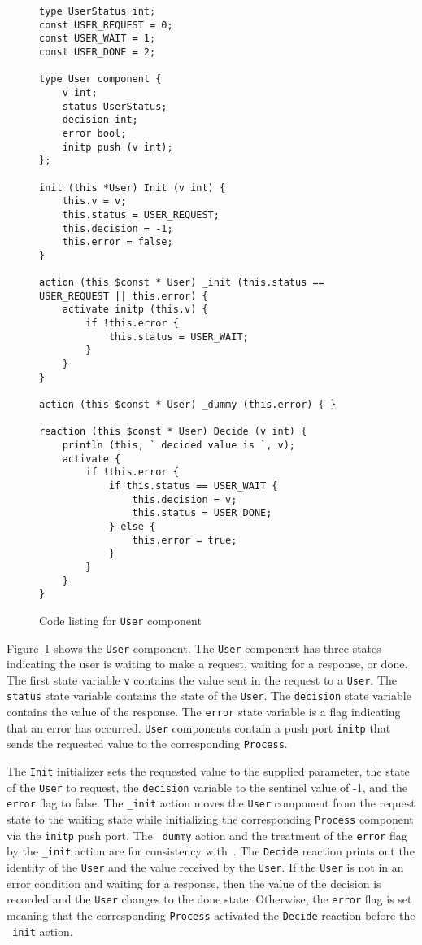 \begin{figure}
\begin{verbatim}
type UserStatus int;
const USER_REQUEST = 0;
const USER_WAIT = 1;
const USER_DONE = 2;

type User component {
    v int;
    status UserStatus;
    decision int;
    error bool;
    initp push (v int);
};

init (this *User) Init (v int) {
    this.v = v;
    this.status = USER_REQUEST;
    this.decision = -1;
    this.error = false;
}

action (this $const * User) _init (this.status == USER_REQUEST || this.error) {
    activate initp (this.v) {
        if !this.error {
            this.status = USER_WAIT;
        }
    }
}

action (this $const * User) _dummy (this.error) { }

reaction (this $const * User) Decide (v int) {
    println (this, ` decided value is `, v);
    activate {
        if !this.error {
            if this.status == USER_WAIT {
                this.decision = v;
                this.status = USER_DONE;
            } else {
                this.error = true;
            }
        }
    }
}
\end{verbatim}
\cprotect\caption{Code listing for \verb+User+ component \label{user}}
\end{figure}

Figure~\ref{user} shows the \verb+User+ component.
The \verb+User+ component has three states indicating the user is waiting to make a request, waiting for a response, or done.
The first state variable \verb+v+ contains the value sent in the request to a \verb+User+.
The \verb+status+ state variable contains the state of the \verb+User+.
The \verb+decision+ state variable contains the value of the response.
The \verb+error+ state variable is a flag indicating that an error has occurred.
\verb+User+ components contain a push port \verb+initp+ that sends the requested value to the corresponding \verb+Process+.

The \verb+Init+ initializer sets the requested value to the supplied parameter, the state of the \verb+User+ to request, the \verb+decision+ variable to the sentinel value of -1, and the \verb+error+ flag to false.
The \verb+_init+ action moves the \verb+User+ component from the request state to the waiting state while initializing the corresponding \verb+Process+ component via the \verb+initp+ push port.
The \verb+_dummy+ action and the treatment of the \verb+error+ flag by the \verb+_init+ action are for consistency with~\cite{nancy1996distributed}.
The \verb+Decide+ reaction prints out the identity of the \verb+User+ and the value received by the \verb+User+.
If the \verb+User+ is not in an error condition and waiting for a response, then the value of the decision is recorded and the \verb+User+ changes to the done state.
Otherwise, the \verb+error+ flag is set meaning that the corresponding \verb+Process+ activated the \verb+Decide+ reaction before the \verb+_init+ action.


